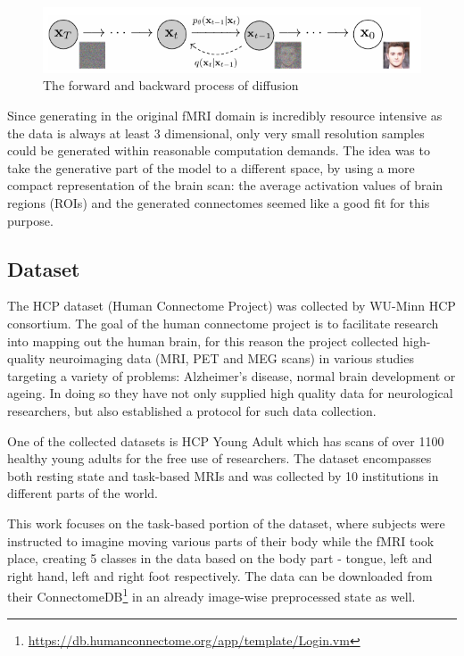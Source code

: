 	\begin{figure}[!h]
		\centering
		\includegraphics[width=\textwidth]{figures/diffusion.png}
		\caption{The forward and backward process of diffusion\cite{ho2020denoising}}
	\end{figure}
	
	
	Since generating in the original fMRI domain is incredibly resource intensive as the data is always at least 3 dimensional, only very small resolution samples could be generated within reasonable computation demands. The idea was to take the generative part of the model to a different space, by using a more compact representation of the brain scan: the average activation values of brain regions (ROIs) and the generated connectomes seemed like a good fit for this purpose.

	\subsection{Dataset}
	
	The HCP dataset (Human Connectome Project) was collected by WU-Minn HCP consortium. The goal of the human connectome project is to facilitate research into mapping	out the human brain, for this reason the project collected high-quality neuroimaging data (MRI, PET and MEG scans) in various studies targeting a variety of problems: Alzheimer's disease, normal brain development or ageing. In doing so they have not only supplied high quality data for neurological researchers, but also established a protocol for such data collection\cite{van2012human}.
	
	One of the collected datasets is HCP Young Adult which has scans of over 1100 healthy young adults for the free use of researchers. The dataset encompasses both resting state and task-based MRIs and was collected by 10 institutions in different parts of the world. 
	
	This work focuses on the task-based portion of the dataset, where subjects were instructed to imagine moving various parts of their body while the fMRI took place, creating 5 classes in the data based on the body part - tongue, left and right hand, left and right foot respectively. The data can be downloaded from their ConnectomeDB\footnote{\url{https://db.humanconnectome.org/app/template/Login.vm}} in an already image-wise preprocessed state as well. 
	
